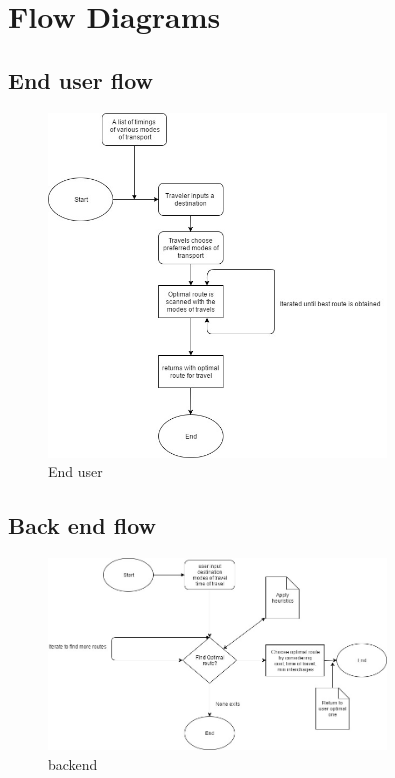 \documentclass[12pt,a4paper]{article}
\begin{document}
\section{Flow Diagrams}

\subsection{End user flow}
\begin{figure}[!hp]
    \centering
    \includegraphics[width=0.8\textwidth]{flowcharts/basicflow.jpg}
    \caption{End user}
    \label{fig:Enduser flow}
\end{figure}
\subsection{Back end flow}

\begin{figure}[!hp]
    \centering
    \includegraphics[width=0.8\textwidth]{flowcharts/backend.jpg}
    \caption{backend}
    \label{fig:backend flow}
\end{figure}
\end{document}
